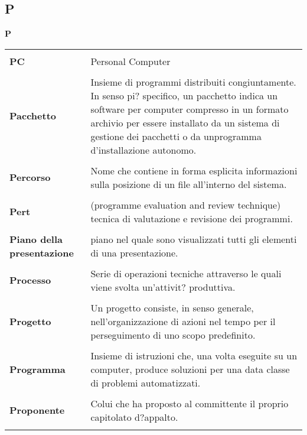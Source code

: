 {\subsection{P} 
\hfill\Huge{\textbf{P}} \\ 
\normalsize 
\begin{longtabu} to 
\toprule \\ 
\textbf{PC} & Personal Computer \\ 
 \\ 
\textbf{Pacchetto} & Insieme di programmi distribuiti congiuntamente. In senso pi? specifico, un pacchetto indica un software per computer compresso in un formato archivio per essere installato da un sistema di gestione dei pacchetti o da unprogramma d'installazione autonomo. \\ 
 \\ 
\textbf{Percorso} & Nome che contiene in forma esplicita informazioni sulla posizione di un file all'interno del sistema. \\ 
 \\ 
\textbf{Pert} & (programme evaluation and review technique) tecnica di valutazione e revisione dei programmi. \\ 
 \\ 
\textbf{Piano della presentazione} & piano nel quale sono visualizzati tutti gli elementi di una presentazione. \\ 
 \\ 
\textbf{Processo} & Serie di operazioni tecniche attraverso le quali viene svolta un'attivit? produttiva. \\ 
 \\ 
\textbf{Progetto} & Un progetto consiste, in senso generale, nell'organizzazione di azioni nel tempo per il perseguimento di uno scopo predefinito. \\ 
 \\ 
\textbf{Programma} & Insieme di istruzioni che, una volta eseguite su un computer, produce soluzioni per una data classe di problemi automatizzati. \\ 
 \\ 
\textbf{Proponente} & Colui che ha proposto al committente il proprio capitolato d?appalto. \\ 
 \\ 
\end{longtabu} 
\newpage 
}
